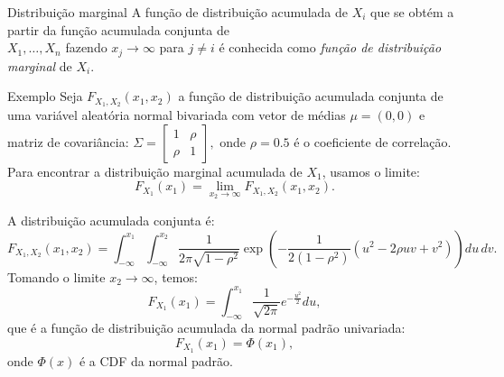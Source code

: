 %
%
%
%
%
%
%


\begin{frame}
\begin{block}{Distribuição marginal}
	A função de distribuição acumulada de $X_i$ que se obtém a partir da função acumulada conjunta de\\ $X_1,\ldots,X_n$ fazendo
	$x_j\rightarrow\infty$ para $j\ne i$ é conhecida como {\em função de distribuição marginal} de $X_i$.
\end{block}

\begin{block}{Exemplo}
	Seja \( F_{X_1, X_2}(x_1, x_2) \) a função de distribuição acumulada conjunta de uma variável aleatória normal bivariada com vetor de médias \( \mu = (0, 0) \) e matriz de covariância:
$
	\Sigma = \begin{bmatrix}
		1 & \rho \\
		\rho & 1
	\end{bmatrix},
	$
	onde \( \rho = 0.5 \) é o coeficiente de correlação. Para encontrar a distribuição marginal acumulada de \( X_1 \), usamos o limite:
	\[
	F_{X_1}(x_1) = \lim_{x_2 \to \infty} F_{X_1, X_2}(x_1, x_2).
	\]
	
	A distribuição acumulada conjunta é:
	\[
	F_{X_1, X_2}(x_1, x_2) = \int_{-\infty}^{x_1} \int_{-\infty}^{x_2} \frac{1}{2\pi\sqrt{1 - \rho^2}}
	\exp\left( -\frac{1}{2(1 - \rho^2)} \left(u^2 - 2\rho uv + v^2 \right) \right) du \, dv.
	\]
		Tomando o limite \( x_2 \to \infty \), temos:
	\[
	F_{X_1}(x_1) = \int_{-\infty}^{x_1} \frac{1}{\sqrt{2\pi}} e^{-\frac{u^2}{2}} du,
	\]
	que é a função de distribuição acumulada da normal padrão univariada:
	\[
	F_{X_1}(x_1) = \Phi(x_1),
	\]
	onde \( \Phi(x) \) é a CDF da normal padrão.
\end{block}	

\end{frame}

